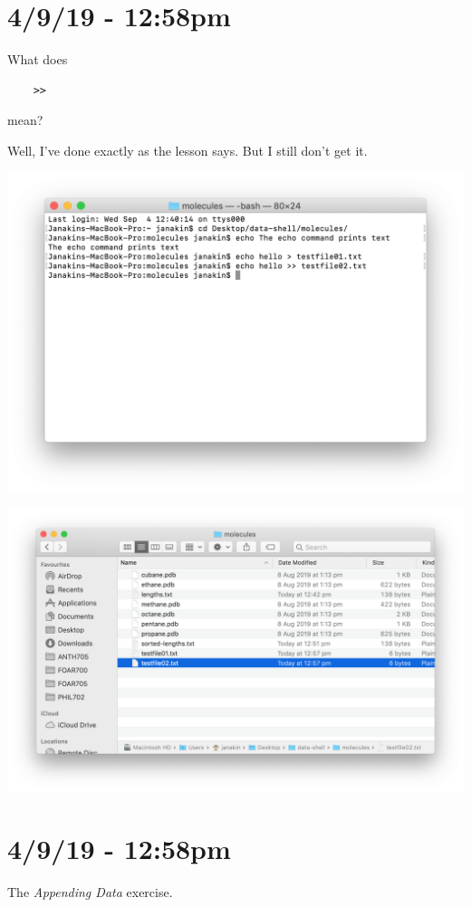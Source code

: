 \documentclass{article}
\begin{document}
\section*{4/9/19 - 12:58pm}

What does \begin{verbatim}
    >>
\end{verbatim} mean?

Well, I've done exactly as the lesson says. But I still don't get it.

\includegraphics[width=\textwidth]{figg.png}

\includegraphics[width=\textwidth]{figh.png}

\section*{4/9/19 - 12:58pm}

The \textit{Appending Data} exercise.
\end{document}
